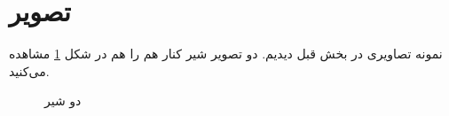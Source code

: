 \section{تصویر}
نمونه تصاویری در بخش قبل دیدیم. دو تصویر شیر کنار هم را هم در شکل \ref{fig:twolion} مشاهده می‌کنید.
\begin{figure}[ht]
\centering 
{}
\caption{دو شیر}
\label{fig:twolion} %
\end{figure}